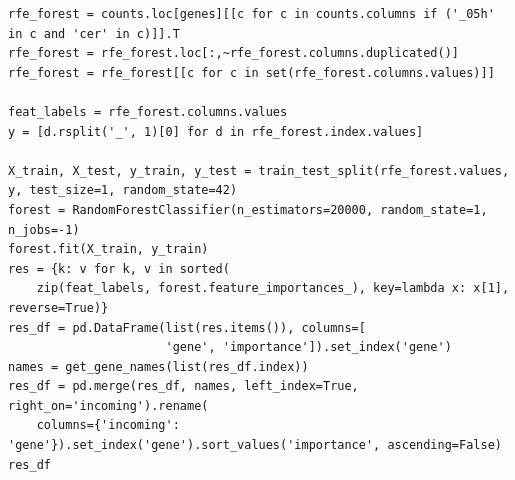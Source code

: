 \documentclass[11pt]{article}
\begin{document}
\begin{verbatim}
rfe_forest = counts.loc[genes][[c for c in counts.columns if ('_05h' in c and 'cer' in c)]].T
rfe_forest = rfe_forest.loc[:,~rfe_forest.columns.duplicated()]
rfe_forest = rfe_forest[[c for c in set(rfe_forest.columns.values)]]

feat_labels = rfe_forest.columns.values
y = [d.rsplit('_', 1)[0] for d in rfe_forest.index.values]

X_train, X_test, y_train, y_test = train_test_split(rfe_forest.values, y, test_size=1, random_state=42)
forest = RandomForestClassifier(n_estimators=20000, random_state=1, n_jobs=-1)
forest.fit(X_train, y_train)
res = {k: v for k, v in sorted(
    zip(feat_labels, forest.feature_importances_), key=lambda x: x[1], reverse=True)}
res_df = pd.DataFrame(list(res.items()), columns=[
                      'gene', 'importance']).set_index('gene')
names = get_gene_names(list(res_df.index))
res_df = pd.merge(res_df, names, left_index=True, right_on='incoming').rename(
    columns={'incoming': 'gene'}).set_index('gene').sort_values('importance', ascending=False)
res_df
\end{verbatim}
\end{document}
